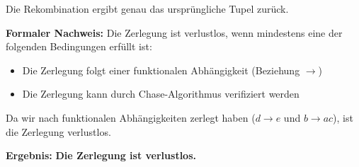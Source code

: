 \documentclass[12pt,a4paper]{article}
\begin{document}
Die Rekombination ergibt genau das ursprüngliche Tupel zurück.

\textbf{Formaler Nachweis:}
Die Zerlegung ist verlustlos, wenn mindestens eine der folgenden Bedingungen erfüllt ist:
\begin{itemize}
    \item Die Zerlegung folgt einer funktionalen Abhängigkeit (Beziehung $ \to $)
    \item Die Zerlegung kann durch Chase-Algorithmus verifiziert werden
\end{itemize}

Da wir nach funktionalen Abhängigkeiten zerlegt haben ($ d \to e$ und $b \to ac$), ist die Zerlegung verlustlos.

\textbf{Ergebnis:} \textbf{Die Zerlegung ist verlustlos.} \checkmark
\end{document}

